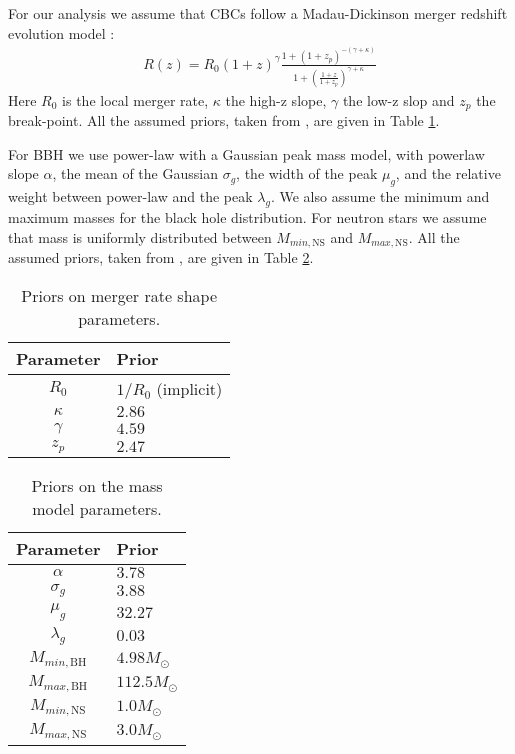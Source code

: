 For our analysis we assume that \acp{CBC} follow a Madau-Dickinson merger redshift evolution model \citep{madau2014cosmic}:
\begin{align}
    R(z) = R_0(1+z)^{\gamma}\frac{1+(1+z_p)^{-(\gamma+\kappa)}}{1+\left( \frac{1+z}{1+z_p}\right)^{\gamma + \kappa}}
\end{align}
Here $R_0$ is the local merger rate, $\kappa$ the high-z slope, $\gamma$ the low-z slop and $z_p$ the break-point. All the assumed priors, taken from \citet{abbott2023gwtc}, are given in Table \ref{tab:Madau}.

For \ac{BBH} we use power-law with a Gaussian peak mass model, with powerlaw slope $\alpha$, the mean of the Gaussian $\sigma_g$, the width of the peak $\mu_g$, and the relative weight between power-law and the peak $\lambda_g$. We also assume the minimum and maximum masses for the black hole distribution. For neutron stars we assume that mass is uniformly distributed between $M_{min,\mathrm{NS}}$ and $M_{max,\mathrm{NS}}$. All the assumed priors, taken from \citet{abbott2023gwtc}, are given in Table \ref{tab:mass_dist}.

\begin{table}[h!]
    \small
    \centering
    \caption{Priors on merger rate shape parameters.}
    \label{tab:Madau}
    \begin{tabular}{c l}
        \hline
        \textbf{Parameter} & \textbf{Prior} \\
        \hline
         $R_0$ & $1/R_0$ (implicit) \\
         $\kappa$ & $2.86$ \\
         $\gamma$ & $4.59$ \\
         $z_p$ & $2.47$ \\
         \hline
    \end{tabular}
\end{table}

\begin{table}[h!]
    \small
    \centering
    \caption{Priors on the mass model parameters.}
    \label{tab:mass_dist}
    \begin{tabular}{c l}
        \hline
        \textbf{Parameter} & \textbf{Prior} \\
        \hline
         $\alpha$ & $3.78$ \\
         $\sigma_g$ & $3.88$ \\
         $\mu_g$ & $32.27$ \\
         $\lambda_g$ & $0.03$ \\
         $M_{min,\mathrm{BH}}$ & $4.98M_{\odot}$ \\
         $M_{max,\mathrm{BH}}$ & $112.5M_{\odot}$ \\
         $M_{min,\mathrm{NS}}$ & $1.0M_{\odot}$ \\
         $M_{max,\mathrm{NS}}$ & $3.0M_{\odot}$ \\
         \hline
    \end{tabular}
\end{table}

